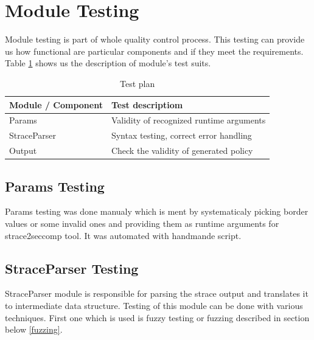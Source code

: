 \section{Module Testing}
Module testing is part of whole quality control process.
This testing can provide us how functional are particular components and if they meet the requirements.
Table \ref{table:moduletesting} shows us the description of module's test suits.

\begin{table}[h]
	\centering
	\begin{tabular}{|l|p{10cm}|}
		\hline
		\textbf{Module / Component}	&	\textbf{Test descriptiom} \\ \hline \hline
		Params 						& Validity of recognized runtime arguments \\ \hline
		StraceParser				& Syntax testing, correct error handling \\ \hline
		Output                      & Check the validity of generated policy \\ \hline
	\end{tabular}
	\caption{Test plan}
	\label{table:moduletesting}
\end{table}

\subsection{Params Testing}
Params testing was done manualy which is ment by systematicaly picking border values
or some invalid ones and providing them as runtime arguments for strace2seccomp tool.
It was automated with handmande script.

\subsection{StraceParser Testing}
StraceParser module is responsible for parsing the strace output and translates
it to intermediate data structure. Testing of this module can be done with
various techniques. First one which is used is fuzzy testing or fuzzing
described in section below \ref{fuzzing}.

